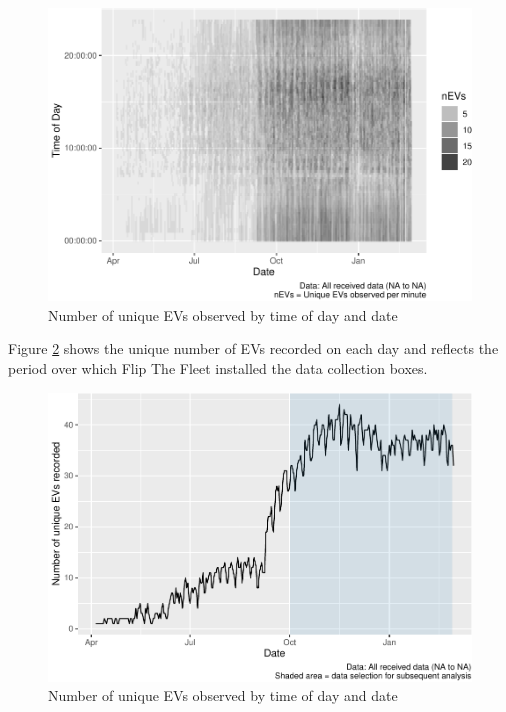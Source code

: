 \documentclass[]{article}
\begin{document}
\begin{figure}
\centering
\includegraphics{EVBB_report_v1_files/figure-latex/initialDataChecksPlotTile-1.pdf}
\caption{\label{fig:initialDataChecksPlotTile}Number of unique EVs observed by time of day and date}
\end{figure}

Figure \ref{fig:initialDataChecksPlotDate} shows the unique number of EVs recorded on each day and reflects the period over which Flip The Fleet installed the data collection boxes.

\begin{figure}
\centering
\includegraphics{EVBB_report_v1_files/figure-latex/initialDataChecksPlotDate-1.pdf}
\caption{\label{fig:initialDataChecksPlotDate}Number of unique EVs observed by time of day and date}
\end{figure}
\end{document}
